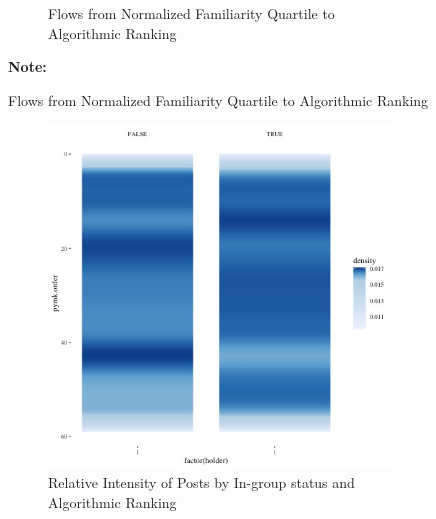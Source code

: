 \documentclass[12pt,letterpaper]{article}
\begin{document}
\begin{figure}[ht]
\begin{subfigure}{.5\textwidth}
        \caption{Flows from Normalized Familiarity Quartile to Algorithmic Ranking}
        \label{fig:pymkpref_s}
    \end{subfigure}
    
\footnotesize \textbf{Note:} 
\end{figure}


\begin{figure}[ht]
\caption{Relationship between PYMK Algorithmic Ranking and in-group Status of Posts}
\label{fig:pymk_bygroup}
    \begin{subfigure}{.5\textwidth} 
        \centering
        \includegraphics[width=1\linewidth]{Output/Graphs/Audit/Heatmaps/US PYMK pymk rank by ingroup - smooth.jpg}  
        \caption{Relative Intensity of Posts by In-group status and Algorithmic Ranking}
        \label{fig:pymk_bygroup_hm}
        \end{subfigure}
    \begin{subfigure}{.5\textwidth}
        \centering

\end{subfigure}
\end{figure}
\end{document}
